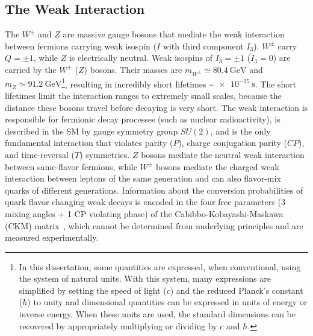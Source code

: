 \subsection{The Weak Interaction}
The $W^\pm$ and $Z$ are massive gauge bosons that mediate the weak interaction between fermions carrying weak isospin ($I$ with third component $I_3$).
$W^\pm$ carry $Q = \pm 1$, while $Z$ is electrically neutral.
Weak isospins of $I_3 = \pm 1$ ($I_3 = 0$) are carried by the $W^\pm$ ($Z$) bosons.
Their masses are $m_{W^\pm} \simeq \SI{80.4}{\GeV}$ and $m_Z \simeq \SI{91.2}{\GeV}$\footnote{In this dissertation, some quantities are expressed, when conventional, using the system of natural units. With this system, many expressions are simplified by setting the speed of light ($c$) and the reduced Planck's constant ($\hbar$) to unity and dimensional quantities can be expressed in units of energy or inverse energy. 
When these units are used, the standard dimensions can be recovered by appropriately multiplying or dividing by $c$ and $\hbar$.}, resulting in incredibly short lifetimes \sim$\SI{e-25}{\s}$. The short lifetimes limit the interaction ranges to extremely small scales, because the distance these bosons travel before decaying is very short.
The weak interaction is responsible for fermionic decay processes (such as nuclear radioactivity), is described in the SM by gauge symmetry group $SU(2)$, and is the only fundamental interaction that violates parity ($P$), charge conjugation parity ($CP$), and time-reversal ($T$) symmetries.
$Z$ bosons mediate the neutral weak interaction between same-flavor fermions, while $W^\pm$ bosons mediate the charged weak interaction between leptons of the same generation and can also flavor-mix quarks of different generations.
Information about the conversion probabilities of quark flavor changing weak decays is encoded in the four free parameters (3 mixing angles + 1 CP violating phase) of the Cabibbo-Kobayashi-Maskawa (CKM) matrix~\cite{10.1143/PTP.49.652}, which cannot be determined from underlying principles and are measured experimentally.

